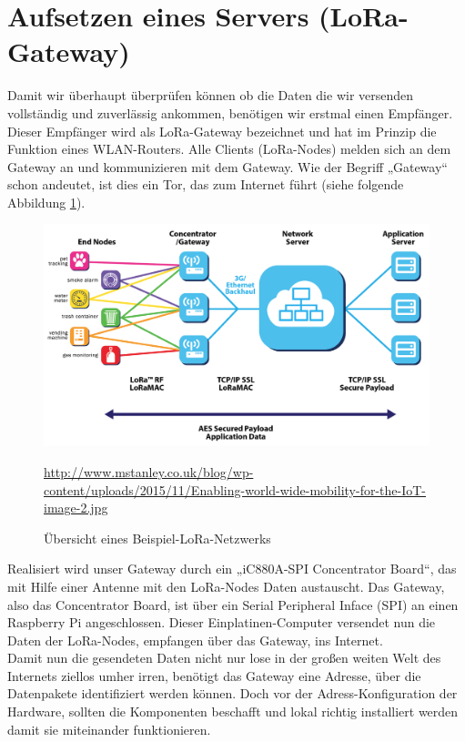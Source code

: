 \section{Aufsetzen eines Servers (LoRa-Gateway)}
Damit wir überhaupt überprüfen können ob die Daten die wir versenden vollständig und zuverlässig ankommen, benötigen wir erstmal einen Empfänger.
Dieser Empfänger wird als LoRa-Gateway bezeichnet und hat im Prinzip die Funktion eines WLAN-Routers. Alle Clients (LoRa-Nodes) melden sich an dem Gateway an und kommunizieren mit dem Gateway. Wie der Begriff „Gateway“ schon andeutet, ist dies ein Tor, das zum Internet führt (siehe folgende Abbildung \ref{fig:lora-schaubild}).
\begin{figure}[H]
    \center
    \includegraphics[width=15cm]{Bilder/lora-schaubild.jpg}\\
    \caption{Übersicht eines Beispiel-LoRa-Netzwerks}
    \begin{center} \quelle\url{http://www.mstanley.co.uk/blog/wp-content/uploads/2015/11/Enabling-world-wide-mobility-for-the-IoT-image-2.jpg} \end{center}
    \label{fig:lora-schaubild}
\end{figure}
\noindent
Realisiert wird unser Gateway durch ein „iC880A-SPI Concentrator Board“, das mit Hilfe einer Antenne mit den LoRa-Nodes Daten austauscht. Das Gateway, also das Concentrator Board, ist über ein Serial Peripheral Inface (SPI) an einen Raspberry Pi angeschlossen. Dieser Einplatinen-Computer versendet nun die Daten der LoRa-Nodes, empfangen über das Gateway, ins Internet.\\
Damit nun die gesendeten Daten nicht nur lose in der großen weiten Welt des Internets ziellos umher irren, benötigt das Gateway eine Adresse, über die Datenpakete identifiziert werden können. Doch vor der Adress-Konfiguration der Hardware, sollten die Komponenten beschafft und lokal richtig installiert werden damit sie miteinander funktionieren.\\

